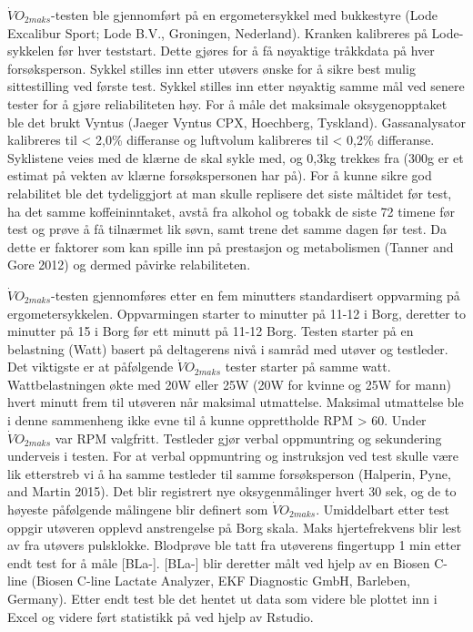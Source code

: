 \documentclass[
  letterpaper,
  DIV=11,
  numbers=noendperiod]{scrreprt}
\begin{document}
\(\dot{V}O_{2maks}\)-testen ble gjennomført på en ergometersykkel med
bukkestyre (Lode Excalibur Sport; Lode B.V., Groningen, Nederland).
Kranken kalibreres på Lode-sykkelen før hver teststart. Dette gjøres for
å få nøyaktige tråkkdata på hver forsøksperson. Sykkel stilles inn etter
utøvers ønske for å sikre best mulig sittestilling ved første test.
Sykkel stilles inn etter nøyaktig samme mål ved senere tester for å
gjøre reliabiliteten høy. For å måle det maksimale oksygenopptaket ble
det brukt Vyntus (Jaeger Vyntus CPX, Hoechberg, Tyskland).
Gassanalysator kalibreres til \textless{} 2,0\% differanse og luftvolum
kalibreres til \textless{} 0,2\% differanse. Syklistene veies med de
klærne de skal sykle med, og 0,3kg trekkes fra (300g er et estimat på
vekten av klærne forsøkspersonen har på). For å kunne sikre god
relabilitet ble det tydeliggjort at man skulle replisere det siste
måltidet før test, ha det samme koffeininntaket, avstå fra alkohol og
tobakk de siste 72 timene før test og prøve å få tilnærmet lik søvn,
samt trene det samme dagen før test. Da dette er faktorer som kan spille
inn på prestasjon og metabolismen (Tanner and Gore 2012) og dermed
påvirke relabiliteten.

\(\dot{V}O_{2maks}\)-testen gjennomføres etter en fem minutters
standardisert oppvarming på ergometersykkelen. Oppvarmingen starter to
minutter på 11-12 i Borg, deretter to minutter på 15 i Borg før ett
minutt på 11-12 Borg. Testen starter på en belastning (Watt) basert på
deltagerens nivå i samråd med utøver og testleder. Det viktigste er at
påfølgende \(\dot{V}O_{2maks}\) tester starter på samme watt.
Wattbelastningen økte med 20W eller 25W (20W for kvinne og 25W for mann)
hvert minutt frem til utøveren når maksimal utmattelse. Maksimal
utmattelse ble i denne sammenheng ikke evne til å kunne opprettholde RPM
\textgreater{} 60. Under \(\dot{V}O_{2maks}\) var RPM valgfritt.
Testleder gjør verbal oppmuntring og sekundering underveis i testen. For
at verbal oppmuntring og instruksjon ved test skulle være lik etterstreb
vi å ha samme testleder til samme forsøksperson (Halperin, Pyne, and
Martin 2015). Det blir registrert nye oksygenmålinger hvert 30 sek, og
de to høyeste påfølgende målingene blir definert som
\(\dot{V}O_{2maks}\). Umiddelbart etter test oppgir utøveren opplevd
anstrengelse på Borg skala. Maks hjertefrekvens blir lest av fra utøvers
pulsklokke. Blodprøve ble tatt fra utøverens fingertupp 1 min etter endt
test for å måle {[}BLa-{]}. {[}BLa-{]} blir deretter målt ved hjelp av
en Biosen C-line (Biosen C-line Lactate Analyzer, EKF Diagnostic GmbH,
Barleben, Germany). Etter endt test ble det hentet ut data som videre
ble plottet inn i Excel og videre ført statistikk på ved hjelp av
Rstudio.
\end{document}
